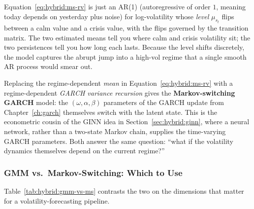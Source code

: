 \begin{intuition}
Equation~\eqref{eq:hybrid:ms-rv} is just an AR(1) (autoregressive of
order $1$, meaning today depends on yesterday plus noise) for
log-volatility whose
\emph{level} $\mu_{s_t}$ flips between a calm value and a crisis value, with
the flips governed by the transition matrix.  The two estimated means tell
you where calm and crisis volatility sit; the two persistences tell you how
long each lasts.  Because the level shifts discretely, the model captures
the abrupt jump into a high-vol regime that a single smooth AR process
would smear out.
\end{intuition}

\begin{projectconnection}
Replacing the regime-dependent \emph{mean} in
Equation~\eqref{eq:hybrid:ms-rv} with a regime-dependent \emph{GARCH
variance recursion} gives the \textbf{Markov-switching GARCH} model: the
$(\omega, \alpha, \beta)$ parameters of the GARCH update from
Chapter~\ref{ch:garch} themselves switch with the latent state.  This is
the econometric cousin of the GINN idea in
Section~\ref{sec:hybrid:ginn}, where a neural network, rather than a
two-state Markov chain, supplies the time-varying GARCH parameters.
Both answer the same question: ``what if the volatility dynamics
themselves depend on the current regime?''
\end{projectconnection}

\subsubsection{GMM vs.\ Markov-Switching: Which to Use}
\label{sec:hybrid:gmm-vs-ms}

Table~\ref{tab:hybrid:gmm-vs-ms} contrasts the two on the dimensions that
matter for a volatility-forecasting pipeline.

